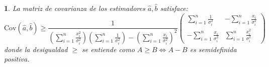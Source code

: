 \documentclass[11pt,a4paper,spanish]{article}
\numberwithin{equation}{section}
\numberwithin{table}{section}
\numberwithin{figure}{section}
\theoremstyle{definition}
\theoremstyle{remark}
\theoremstyle{definition}
\theoremstyle{remark}
\theoremstyle{plain}
\newtheorem{prop}{\protect\propositionname}[section]
\theoremstyle{plain}
\theoremstyle{plain}
\theoremstyle{plain}
\theoremstyle{plain}
\theoremstyle{plain}
\providecommand{\propositionname}{Proposición}
\begin{document}
	\begin{prop}
		La matriz de covarianza de los estimadores $\hat{a},\hat{b}$ satisface:
		\[
		\mathrm{Cov}\left(\hat{a},\hat{b}\right)\ge\frac{{\displaystyle 1}}{{\displaystyle \left(\sum_{i=1}^{n}\frac{x_{i}^{2}}{\sigma_{i}^{2}}\right)\left(\sum_{i=1}^{n}\frac{1}{\sigma_{i}^{2}}\right)-\left(\sum_{i=1}^{n}\frac{x_{i}}{\sigma_{i}^{2}}\right)^{2}}}\left(\begin{matrix}{\displaystyle \sum_{i=1}^{n}\frac{1}{\sigma_{i}^{2}}} & {\displaystyle -\sum_{i=1}^{n}\frac{x_{i}}{\sigma_{i}^{2}}}\\
			{\displaystyle -\sum_{i=1}^{n}\frac{x_{i}}{\sigma_{i}^{2}}} & {\displaystyle \sum_{i=1}^{n}\frac{x_{i}^{2}}{\sigma_{i}^{2}}}
		\end{matrix}\right)
		\]
		donde la desigualdad $\ge$ se entiende como $A\ge B\iff A-B$ es
		semidefinida positiva.
	\end{prop}
\end{document}
